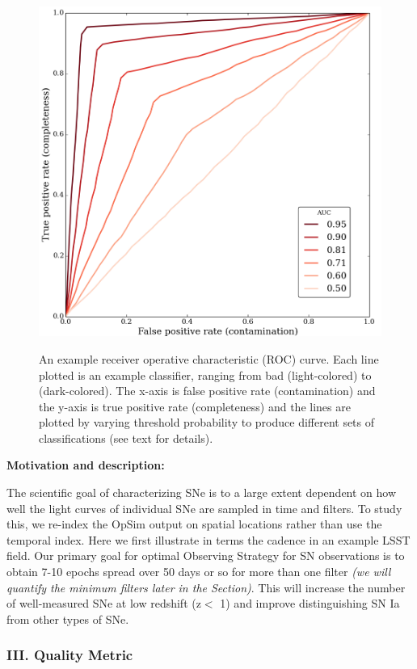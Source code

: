 \begin{figure}
\centering
\includegraphics[width=0.7\hsize]{figs/supernova/roc_illustration}
\label{fig:roc}
\caption{An example receiver operative characteristic (ROC) curve. Each
line plotted is an example classifier, ranging from bad (light-colored)
to (dark-colored). The x-axis is false positive rate (contamination) and
the y-axis is true positive rate (completeness) and the lines are
plotted by varying threshold probability to produce different sets of
classifications (see text for details).}
\end{figure}


{\bf Motivation and description:}

The scientific goal of characterizing SNe is to a large extent dependent
on how well the light curves of individual SNe are sampled in time and
filters. To study this, we re-index the OpSim output on spatial
locations rather than use the temporal index. Here we first illustrate
in terms the cadence in an example LSST field. Our primary goal for
optimal Observing Strategy for SN observations is to obtain 7-10 epochs
spread over 50 days or so for more than one filter {\it (we will
quantify the minimum filters later in the Section)}. This will increase
the number of well-measured SNe at low redshift (z$<$ 1) and improve
distinguishing SN Ia from other types of SNe.


\subsubsection{III. Quality Metric}

